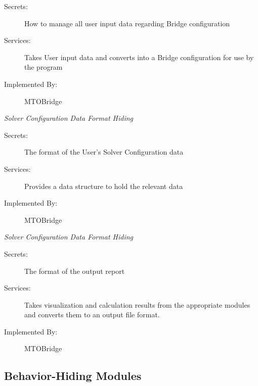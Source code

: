 \documentclass[12pt, titlepage]{article}
\begin{document}
    \begin{description}
        \item[Secrets:]How to manage all user input data regarding Bridge configuration
        \item[Services:]Takes User input data and converts into a Bridge configuration for use by the program
        \item[Implemented By:] MTOBridge\\
    \end{description}
    \emph{{\large Solver Configuration Data Format Hiding}}
    \begin{description}
        \item[Secrets:]The format of the User's Solver Configuration data
        \item[Services:]Provides a data structure to hold the relevant data
        \item[Implemented By:] MTOBridge\\
    \end{description}
    \emph{{\large Solver Configuration Data Format Hiding}}
    \begin{description}
        \item[Secrets:]The format of the output report
        \item[Services:]Takes visualization and calculation results from the appropriate modules and converts them to an output file format.
        \item[Implemented By:] MTOBridge\\
    \end{description}

\subsection{Behavior-Hiding Modules}
\end{document}
